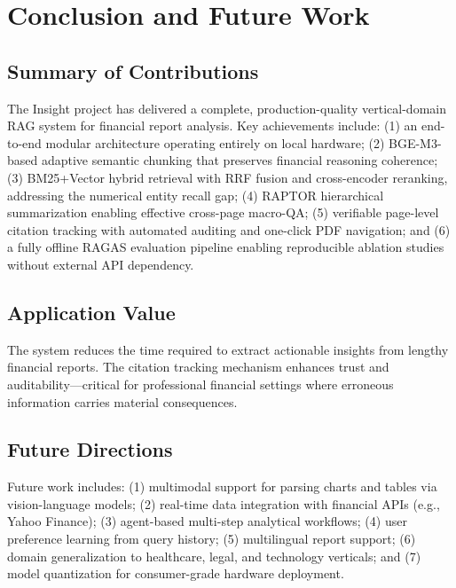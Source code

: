 \documentclass[11pt, a4paper]{article}
\begin{document}
\section{Conclusion and Future Work}

\subsection{Summary of Contributions}

The Insight project has delivered a complete, production-quality vertical-domain RAG system for financial report analysis. Key achievements include: (1) an end-to-end modular architecture operating entirely on local hardware; (2) BGE-M3-based adaptive semantic chunking that preserves financial reasoning coherence; (3) BM25+Vector hybrid retrieval with RRF fusion and cross-encoder reranking, addressing the numerical entity recall gap; (4) RAPTOR hierarchical summarization enabling effective cross-page macro-QA; (5) verifiable page-level citation tracking with automated auditing and one-click PDF navigation; and (6) a fully offline RAGAS evaluation pipeline enabling reproducible ablation studies without external API dependency.

\subsection{Application Value}

The system reduces the time required to extract actionable insights from lengthy financial reports. The citation tracking mechanism enhances trust and auditability---critical for professional financial settings where erroneous information carries material consequences.

\subsection{Future Directions}

Future work includes: (1) multimodal support for parsing charts and tables via vision-language models; (2) real-time data integration with financial APIs (e.g., Yahoo Finance); (3) agent-based multi-step analytical workflows; (4) user preference learning from query history; (5) multilingual report support; (6) domain generalization to healthcare, legal, and technology verticals; and (7) model quantization for consumer-grade hardware deployment.
\end{document}
